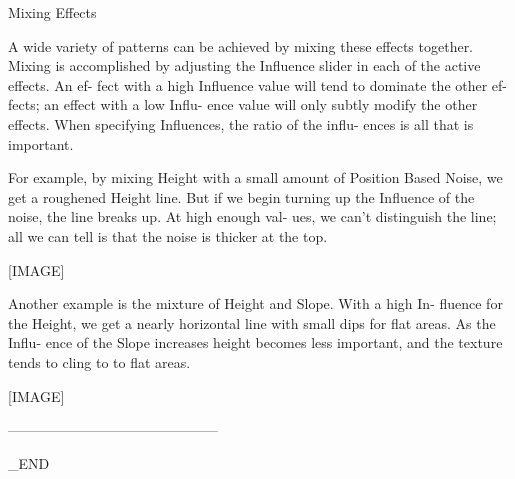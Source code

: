        Mixing Effects

       A wide variety of patterns can be
       achieved by mixing these effects
       together. Mixing is accomplished by
       adjusting the Influence slider in
       each of the active effects. An ef-
       fect with a high Influence value
       will tend to dominate the other ef-
       fects; an effect with a low Influ-
       ence value will only subtly modify
       the other effects.  When specifying
       Influences, the ratio of the influ-
       ences is all that is important.

       For example, by mixing Height with
       a small amount of Position Based
       Noise, we get a roughened Height
       line. But if we begin turning up
       the Influence of the noise, the
       line breaks up. At high enough val-
       ues, we can't distinguish the line;
       all we can tell is that the noise
       is thicker at the top.

       [IMAGE]

       Another example is the mixture of
       Height and Slope. With a high In-
       fluence for the Height, we get a
       nearly horizontal line with small
       dips for flat areas. As the Influ-
       ence of the Slope increases height
       becomes less important, and the
       texture tends to cling to to flat
       areas.

       [IMAGE]

---------------------------------------------

_END


